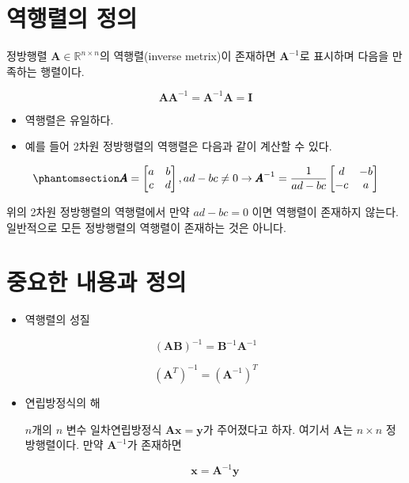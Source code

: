 \documentclass[
  11pt,
  a4paper,
  oneside]{scrbook}
\providecommand{\tightlist}{%
  \setlength{\itemsep}{0pt}\setlength{\parskip}{0pt}}\usepackage{longtable,booktabs,array}
\newcommand{\RR}{\mathbb{R}}
\theoremstyle{definition}
\theoremstyle{definition}
\theoremstyle{plain}
\theoremstyle{remark}
\begin{document}
\section{역행렬의 정의}\label{uxc5eduxd589uxb82cuxc758-uxc815uxc758}

정방행렬 \(\pmb A \in \RR^{n \times n}\)의 역행렬(inverse metrix)이
존재하면 \(\pmb A^{-1}\)로 표시하며 다음을 만족하는 행렬이다.

\[ \pmb A \pmb A^{-1} = \pmb A^{-1} \pmb A= \pmb I \]

\begin{itemize}
\item
  역행렬은 유일하다.
\item
  예를 들어 2차원 정방행렬의 역행렬은 다음과 같이 계산할 수 있다.
\end{itemize}

\begin{equation}\phantomsection\label{eq-inverse-22}{
\pmb A =
\begin{bmatrix}
a & b \\
c & d 
\end{bmatrix}, ad-bc \ne 0
\rightarrow
{\pmb A}^{-1} = \frac{1}{ad-bc}
\begin{bmatrix}
d & -b \\
-c & a 
\end{bmatrix}
}\end{equation}

위의 2차원 정방행렬의 역행렬에서 만약 \(ad-bc =0\) 이면 역행렬이
존재하지 않는다. 일반적으로 모든 정방행렬의 역행렬이 존재하는 것은
아니다.

\section{중요한 내용과
정의}\label{uxc911uxc694uxd55c-uxb0b4uxc6a9uxacfc-uxc815uxc758-2}

\begin{itemize}
\tightlist
\item
  역행렬의 성질
\end{itemize}

\[ (\pmb A \pmb B)^{-1} = {\pmb B}^{-1} {\pmb A}^{-1} \]

\[ (\pmb A^T)^{-1} = (\pmb A^{-1})^{T} \]

\begin{itemize}
\item
  연립방정식의 해

  \(n\)개의 \(n\) 변수 일차연립방정식 \(\pmb A \pmb x = \pmb y\)가
  주어졌다고 하자. 여기서 \(\pmb A\)는 \(n \times n\) 정방행렬이다. 만약
  \(\pmb A^{-1}\)가 존재하면

  \[ \pmb x = \pmb A^{-1} \pmb y \]
\end{itemize}
\end{document}
